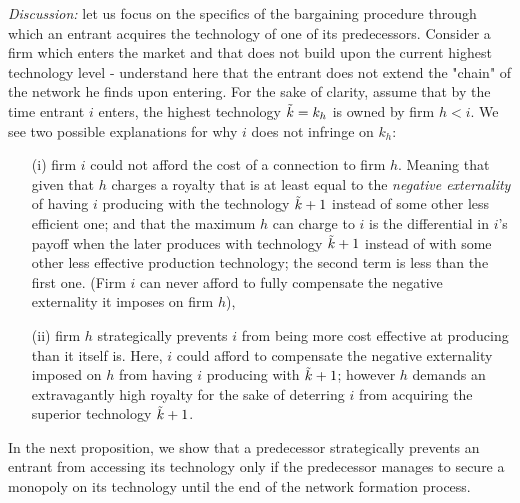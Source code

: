 \documentclass{article}
\begin{document}
\indent \textit{Discussion:} let us focus on the specifics of the bargaining procedure through which an entrant acquires the technology of one of its predecessors. Consider a firm which enters the market and that does not build upon the current highest technology level - understand here that the entrant does not extend the "chain" of the network he finds upon entering. For the sake of clarity, assume that by the time entrant $i$ enters, the highest technology $\Tilde{k}=k_h$ is owned by firm $h<i$. We see two possible explanations for why $i$ does not infringe on $k_h$: 
\begin{enumerate}
    \item[(i)] firm $i$ could not afford the cost of a connection to firm $h$. Meaning that given that $h$ charges a royalty that is at least equal to the \textit{negative externality} of having $i$ producing with the technology $\Tilde{k}+1$ instead of some other less efficient one; and that the maximum $h$ can charge to $i$ is the differential in $i$'s payoff when the later produces with technology $\Tilde{k}+1$ instead of with some other less effective production technology; the second term is less than the first one. (Firm $i$ can never afford to fully compensate the negative externality it imposes on firm $h$),
    \item[(ii)] firm $h$ strategically prevents $i$ from being more cost effective at producing than it itself is. Here, $i$ could afford to compensate the negative externality imposed on $h$ from having $i$ producing with $\Tilde{k}+1$; however $h$ demands an extravagantly high royalty for the sake of deterring $i$ from acquiring the superior technology $\Tilde{k}+1$. 
\end{enumerate}

\indent In the next proposition, we show that a predecessor strategically prevents an entrant from accessing its technology only if the predecessor manages to secure a monopoly on its technology until the end of the network formation process. \\
\end{document}
